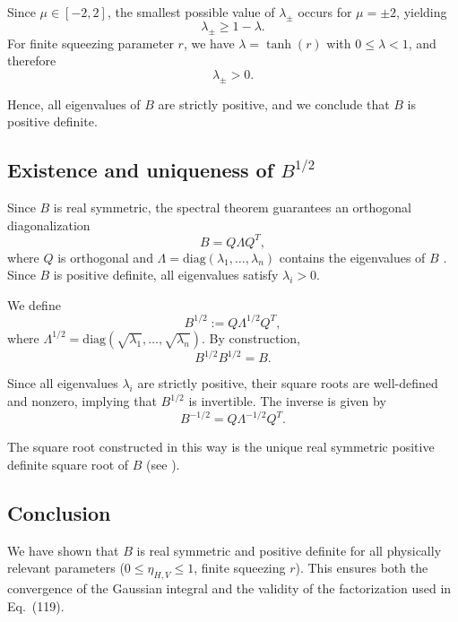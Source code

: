 \documentclass[%
 reprint,
 amsmath,amssymb,
 aps,
twocolumn
]{revtex4-2}
\begin{document}
Since $\mu \in [-2,2]$, the smallest possible value of $\lambda_\pm$ occurs for $\mu = \pm 2$, yielding
\begin{equation}
\lambda_\pm \ge 1 - \lambda.
\end{equation}
For finite squeezing parameter $r$, we have $\lambda = \tanh(r)$ with $0 \le \lambda < 1$, and therefore
\begin{equation}
\lambda_\pm > 0.
\end{equation}

Hence, all eigenvalues of $B$ are strictly positive, and we conclude that $B$ is positive definite.

\subsection{Existence and uniqueness of $B^{1/2}$}
Since $B$ is real symmetric, the spectral theorem guarantees an orthogonal diagonalization
\begin{equation}
B = Q \Lambda Q^T,
\end{equation}
where $Q$ is orthogonal and $\Lambda = \mathrm{diag}(\lambda_1,\dots,\lambda_n)$ contains the eigenvalues of $B$ \cite{GilbertIntroductionToLinearAlgebra2016}. Since $B$ is positive definite, all eigenvalues satisfy $\lambda_i > 0$.

We define
\begin{equation}
B^{1/2} := Q \Lambda^{1/2} Q^T,
\end{equation}
where $\Lambda^{1/2} = \mathrm{diag}(\sqrt{\lambda_1},\dots,\sqrt{\lambda_n})$. By construction,
\begin{equation}
B^{1/2} B^{1/2} = B.
\end{equation}

Since all eigenvalues $\lambda_i$ are strictly positive, their square roots are well-defined and nonzero, implying that $B^{1/2}$ is invertible. The inverse is given by
\begin{equation}
B^{-1/2} = Q \Lambda^{-1/2} Q^T.
\end{equation}

The square root constructed in this way is the unique real symmetric positive definite square root of $B$ (see \cite{GilbertIntroductionToLinearAlgebra2016}).

\subsection{Conclusion}

We have shown that $B$ is real symmetric and positive definite for all physically relevant parameters ($0 \le \eta_{H,V} \le 1$, finite squeezing $r$). This ensures both the convergence of the Gaussian integral and the validity of the factorization used in Eq.~(119).
\end{document}
